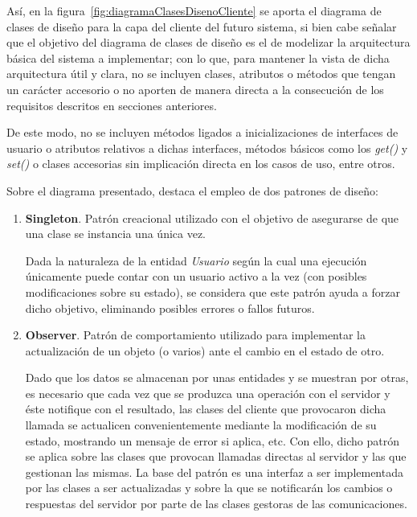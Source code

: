 Así, en la figura~\ref{fig:diagramaClasesDisenoCliente} se aporta el diagrama de clases de diseño para la capa del cliente del futuro sistema, si bien cabe señalar que el objetivo del diagrama de clases de diseño es el de modelizar la arquitectura básica del sistema a implementar; con lo que, para mantener la vista de dicha arquitectura útil y clara, no se incluyen clases, atributos o métodos que tengan un carácter accesorio o no aporten de manera directa a la consecución de los requisitos descritos en secciones anteriores. 

De este modo, no se incluyen métodos ligados a inicializaciones de interfaces de usuario o atributos relativos a dichas interfaces, métodos básicos como los \textit{get()} y \textit{set()} o clases accesorias sin implicación directa en los casos de uso, entre otros.

Sobre el diagrama presentado, destaca el empleo de dos patrones de diseño:

\begin{enumerate}
	\item \textbf{Singleton}. Patrón creacional utilizado con el objetivo de asegurarse de que una clase se instancia una única vez. 
	
	Dada la naturaleza de la entidad \emph{Usuario} según la cual una ejecución únicamente puede contar con un usuario activo a la vez (con posibles modificaciones sobre su estado), se considera que este patrón ayuda a forzar dicho objetivo, eliminando posibles errores o fallos futuros.
	\item \textbf{Observer}. Patrón de comportamiento utilizado para implementar la actualización de un objeto (o varios) ante el cambio en el estado de otro.
	
	Dado que los datos se almacenan por unas entidades y se muestran por otras, es necesario que cada vez que se produzca una operación con el servidor y éste notifique con el resultado, las clases del cliente que provocaron dicha llamada se actualicen convenientemente mediante la modificación de su estado, mostrando un mensaje de error si aplica, etc. Con ello, dicho patrón se aplica sobre las clases que provocan llamadas directas al servidor y las que gestionan las mismas. La base del patrón es una interfaz a ser implementada por las clases a ser actualizadas y sobre la que se notificarán los cambios o respuestas del servidor por parte de las clases gestoras de las comunicaciones.
\end{enumerate} 

